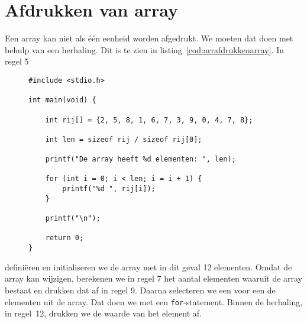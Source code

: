 \section{Afdrukken van array}
Een array kan niet als één eenheid worden afgedrukt. We moeten dat doen met behulp van een herhaling. Dit is te zien in listing~\ref{cod:arrafdrukkenarray}. In regel 5 %
\begin{figure}[!b]
\begin{lstlisting}[caption=Afdrukken van een array.,label=cod:arrafdrukkenarray]
#include <stdio.h>

int main(void) {

    int rij[] = {2, 5, 8, 1, 6, 7, 3, 9, 0, 4, 7, 8};

    int len = sizeof rij / sizeof rij[0];

    printf("De array heeft %d elementen: ", len);

    for (int i = 0; i < len; i = i + 1) {
        printf("%d ", rij[i]);
    }

    printf("\n");
    
    return 0;
}
\end{lstlisting}
\end{figure}
%
definiëren en initialiseren we de array met in dit geval 12 elementen. Omdat de array kan wijzigen, berekenen we in regel 7 het aantal elementen waaruit de array bestaat en drukken dat af in regel 9. Daarna selecteren we een voor een de elementen uit de array. Dat doen we met een \texttt{for}-statement. Binnen de herhaling, in regel~12, drukken we de waarde van het element af.



